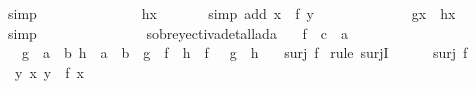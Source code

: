 \begin{isabellebody}
\ simp\isanewline
\ \ \ \ \ \ \ \ \isamarkupfalse%
\ \isamarkupfalse%
\ \ {\isachardoublequoteopen}{\isachardot}{\isachardot}{\isachardot}\ {\isacharequal}\ h{\isacharparenleft}x{\isacharparenright}{\isachardoublequoteclose}\ \isamarkupfalse%
\ {}\ \ \ \isamarkupfalse%
\ {\isacharparenleft}simp\ add{\isacharcolon}\ {\isacartoucheopen}x\ {\isacharequal}\ f\ y{\isacartoucheclose}{\isacharparenright}\isanewline
\ \ \ \ \ \ \ \ \isamarkupfalse%
\ \isamarkupfalse%
\ \ {\isachardoublequoteopen}\ g{\isacharparenleft}x{\isacharparenright}\ {\isacharequal}\ h{\isacharparenleft}x{\isacharparenright}\ {\isachardoublequoteclose}\ \isamarkupfalse%
\ simp\isanewline
\ \ \ \ \ \ \isamarkupfalse%
\isanewline
\ \ \ \ \isamarkupfalse%
\isanewline
\ \ \isamarkupfalse%
\isanewline
{}\isamarkupfalse%
%
\endisatagproof
{\isafoldproof}%
%
\isadelimproof
\isanewline
%
\endisadelimproof
\isanewline
\isanewline
{}\isamarkupfalse%
\ sobreyectivadetallada{}{\isacharcolon}\isanewline
\ \ \ f\ {\isacharcolon}{\isacharcolon}\ {\isachardoublequoteopen}{\isacharprime}c\ {\isasymRightarrow}\ {\isacharprime}a{\isachardoublequoteclose}\ \isanewline
\ \ \ {\isachardoublequoteopen}{\isasymforall}{\isacharparenleft}g\ {\isacharcolon}{\isacharcolon}\ {\isacharprime}a\ {\isasymRightarrow}\ {\isacharprime}b{\isacharparenright}\ {\isacharparenleft}h\ {\isacharcolon}{\isacharcolon}\ {\isacharprime}a\ {\isasymRightarrow}\ {\isacharprime}b{\isacharparenright}{\isachardot}\ {\isacharparenleft}\ g\ {\isasymcirc}\ f\ {\isacharequal}\ h\ {\isasymcirc}\ f\ {\isacharparenright}\ {\isasymlongrightarrow}\ {\isacharparenleft}g\ {\isacharequal}\ h{\isacharparenright}{\isachardoublequoteclose}\isanewline
\ \ \ {\isachardoublequoteopen}surj\ f{\isachardoublequoteclose}\isanewline
%
\isadelimproof
%
\endisadelimproof
%
\isatagproof
{}\isamarkupfalse%
\ {\isacharparenleft}rule\ surjI{\isacharparenright}\isanewline
\ \ \isamarkupfalse%
\ {}{\isacharcolon}{\isachardoublequoteopen}\ {\isasymnot}\ surj\ f{\isachardoublequoteclose}\isanewline
\ \ \isamarkupfalse%
\ {\isachardoublequoteopen}\ {\isasymnot}{\isacharparenleft}{\isasymforall}y{\isachardot}\ {\isasymexists}x{\isachardot}\ y\ {\isacharequal}\ f\ x{\isacharparenright}{\isachardoublequoteclose}\ \isamarkupfalse%

\end{isabellebody}

